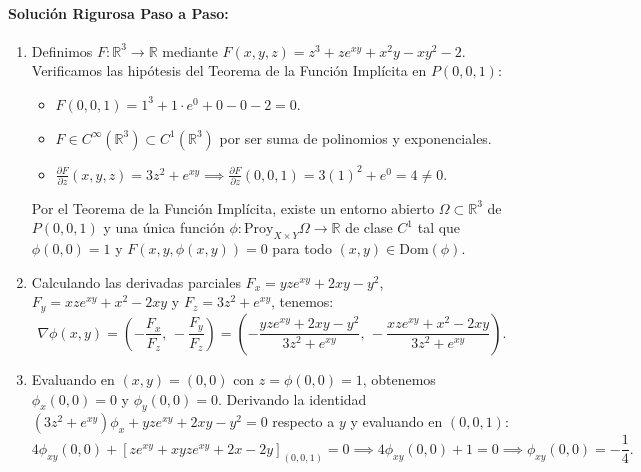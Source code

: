 \documentclass[11pt,a4paper]{article}
\begin{document}
\paragraph{Solución Rigurosa Paso a Paso:}
\begin{enumerate}[label=\textbf{\alph*)}]
  \item Definimos $F: \mathbb{R}^3 \to \mathbb{R}$ mediante $F(x,y,z) = z^3 + ze^{xy} + x^2y - xy^2 - 2$. Verificamos las hipótesis del Teorema de la Función Implícita en $P(0,0,1)$:
  \begin{itemize}
    \item $F(0,0,1) = 1^3 + 1\cdot e^0 + 0 - 0 - 2 = 0$.
    \item $F \in C^\infty(\mathbb{R}^3) \subset C^1(\mathbb{R}^3)$ por ser suma de polinomios y exponenciales.
    \item $\frac{\partial F}{\partial z}(x,y,z) = 3z^2 + e^{xy} \implies \frac{\partial F}{\partial z}(0,0,1) = 3(1)^2 + e^0 = 4 \neq 0$.
  \end{itemize}
  Por el Teorema de la Función Implícita, existe un entorno abierto $\Omega \subset \mathbb{R}^3$ de $P(0,0,1)$ y una única función $\phi: \text{Proy}_{X\times Y}\Omega \to \mathbb{R}$ de clase $C^1$ tal que $\phi(0,0)=1$ y $F(x,y,\phi(x,y))=0$ para todo $(x,y) \in \text{Dom}(\phi)$.
  \item Calculando las derivadas parciales $F_x = yze^{xy} + 2xy - y^2$, $F_y = xze^{xy} + x^2 - 2xy$ y $F_z = 3z^2 + e^{xy}$, tenemos:
  \[ \nabla \phi(x,y) = \left( -\frac{F_x}{F_z}, \, -\frac{F_y}{F_z} \right) = \left( -\frac{yz e^{xy} + 2xy - y^2}{3z^2 + e^{xy}}, \, -\frac{xz e^{xy} + x^2 - 2xy}{3z^2 + e^{xy}} \right). \]
  \item Evaluando en $(x,y)=(0,0)$ con $z=\phi(0,0)=1$, obtenemos $\phi_x(0,0) = 0$ y $\phi_y(0,0) = 0$. Derivando la identidad $(3z^2+e^{xy})\phi_x + yze^{xy} + 2xy - y^2 = 0$ respecto a $y$ y evaluando en $(0,0,1)$:
  \[ 4\phi_{xy}(0,0) + \left[ z e^{xy} + xyze^{xy} + 2x - 2y \right]_{(0,0,1)} = 0 \implies 4\phi_{xy}(0,0) + 1 = 0 \implies \phi_{xy}(0,0) = -\frac{1}{4}. \]
\end{enumerate}
\end{document}

